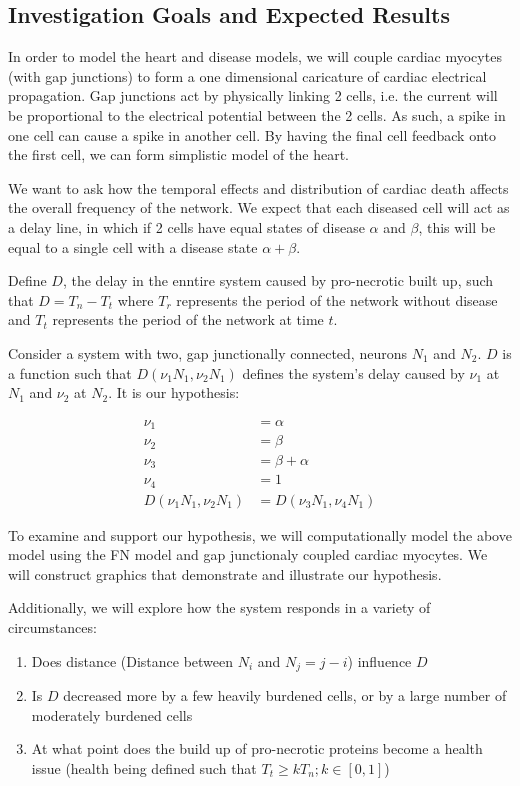 \documentclass[11pt]{article}
\begin{document}
\subsection{Investigation Goals and Expected Results}

In order to model the heart and disease models, we will couple cardiac myocytes (with gap junctions) to form a one dimensional caricature of cardiac electrical propagation. Gap junctions act by physically linking 2 cells, i.e. the current will be proportional to the electrical potential between the 2 cells. As such, a spike in one cell can cause a spike in another cell. By having the final cell feedback onto the first cell, we can form simplistic model of the heart.

We want to ask how the temporal effects and distribution of cardiac death affects the overall frequency of the network. We expect that each diseased cell will act as a delay line, in which if 2 cells have equal states of disease $\alpha$ and $\beta$, this will be equal to a single cell with a disease state $\alpha+\beta$. 

Define $D$, the delay in the enntire system caused by pro-necrotic built up, such that $D=T_n - T_t$ where $T_r$ represents the period of the network without disease and $T_t$ represents the period of the network at time $t$. 

Consider a system with two, gap junctionally connected, neurons $N_1$ and $N_2$. $D$ is a function such that $D(\nu_1 N_1, \nu_2 N_1)$ defines the system's delay caused by $\nu_1$ at $N_1$ and $\nu_2$ at $N_2$. It is our hypothesis: 

$$ \begin{aligned} \nu_1 &= \alpha \\ \nu_2 &= \beta \\ \nu_3 &= \beta + \alpha \\ \nu_4 &= 1 \\ D(\nu_1 N_1, \nu_2 N_1) &= D(\nu_3 N_1, \nu_4 N_1) \end{aligned} $$ 

To examine and support our hypothesis, we will computationally model the above model using the FN model and gap junctionaly coupled cardiac myocytes. We will construct graphics that demonstrate and illustrate our hypothesis.

Additionally, we will explore how the system responds in a variety of circumstances:

\begin{enumerate}
	\item Does distance (Distance between $N_i$ and $N_j= j -i$) influence $D$
	\item Is $D$ decreased more by a few heavily burdened cells, or by a large number of moderately burdened cells
	\item At what point does the build up of pro-necrotic proteins become a health issue (health being defined such that $T_t \geq kT_n; k\in[0,1]$)
\end{enumerate}
\end{document}
